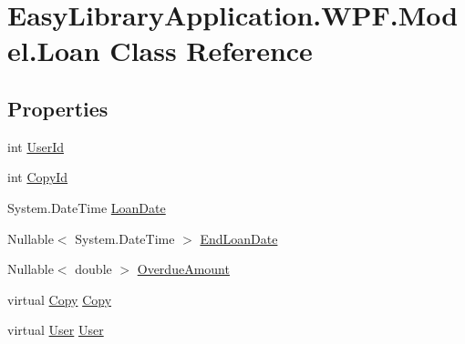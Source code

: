 \hypertarget{class_easy_library_application_1_1_w_p_f_1_1_model_1_1_loan}{}\section{Easy\+Library\+Application.\+W\+P\+F.\+Model.\+Loan Class Reference}
\label{class_easy_library_application_1_1_w_p_f_1_1_model_1_1_loan}
\subsection*{Properties}
\begin{DoxyCompactItemize}
\item 
int \mbox{\hyperlink{class_easy_library_application_1_1_w_p_f_1_1_model_1_1_loan_a32462dde2df259f6764681c9defca084}{User\+Id}}
\item 
int \mbox{\hyperlink{class_easy_library_application_1_1_w_p_f_1_1_model_1_1_loan_abde2e5315aa23f0ef5bdb33135cff3e2}{Copy\+Id}}
\item 
System.\+Date\+Time \mbox{\hyperlink{class_easy_library_application_1_1_w_p_f_1_1_model_1_1_loan_ab9de713ec7428cf6a9ed1bcb17fdac6e}{Loan\+Date}}
\item 
Nullable$<$ System.\+Date\+Time $>$ \mbox{\hyperlink{class_easy_library_application_1_1_w_p_f_1_1_model_1_1_loan_ac53bff06fc5b7f00943bb98b7ef5b342}{End\+Loan\+Date}}
\item 
Nullable$<$ double $>$ \mbox{\hyperlink{class_easy_library_application_1_1_w_p_f_1_1_model_1_1_loan_a2a2de1c166ce6ac11dff9d031e806475}{Overdue\+Amount}}
\item 
virtual \mbox{\hyperlink{class_easy_library_application_1_1_w_p_f_1_1_model_1_1_copy}{Copy}} \mbox{\hyperlink{class_easy_library_application_1_1_w_p_f_1_1_model_1_1_loan_a696d7d57fb5241078425123601f7aa0c}{Copy}}
\item 
virtual \mbox{\hyperlink{class_easy_library_application_1_1_w_p_f_1_1_model_1_1_user}{User}} \mbox{\hyperlink{class_easy_library_application_1_1_w_p_f_1_1_model_1_1_loan_ad7a4560056938ca49c9bd2bb9bf0a213}{User}}
\end{DoxyCompactItemize}


